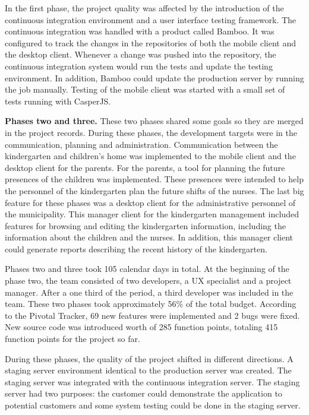 In the first phase, the project quality was affected by the introduction of the continuous integration environment and a user interface testing framework. 
The continuous integration was handled with a product called Bamboo. It was configured to track the changes in the repositories of both the mobile client and the desktop client. Whenever a change was pushed into the repository, the continuous integration system would run the tests and update the testing environment. In addition, Bamboo could update the production server by running the job manually. Testing of the mobile client was started with a small set of tests running with CasperJS.

\textbf{Phases two and three.} These two phases shared some goals so they are merged in the project records. During these phases, the development targets were in the communication, planning and administration. Communication between the kindergarten and children's home was implemented to the mobile client and the desktop client for the parents. For the parents, a tool for planning the future presences of the children was implemented. These presences were intended to help the personnel of the kindergarten plan the future shifts of the nurses. The last big feature for these phases was a desktop client for the administrative personnel of the municipality. This manager client for the kindergarten management included features for browsing and editing the kindergarten information, including the information about the children and the nurses. In addition, this manager client could generate reports describing the recent history of the kindergarten.

Phases two and three took 105 calendar days in total. At the beginning of the phase two, the team consisted of two developers, a UX specialist and a project manager. After a one third of the period, a third developer was included in the team. These two phases took approximately 56\% of the total budget. According to the Pivotal Tracker, 69 new features were implemented and 2 bugs were fixed. New source code was introduced worth of 285 function points, totaling 415 function points for the project so far.

During these phases, the quality of the project shifted in different directions. A staging server environment identical to the production server was created. The staging server was integrated with the continuous integration server. The staging server had two purposes: the customer could demonstrate the application to potential customers and some system testing could be done in the staging server.

